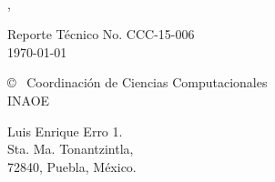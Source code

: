 \begin{titlepage}
    \begin{center}
        \mbox{ }\par
        \vspace{2.5cm}
        {\huge\bfseries\titulo\par}
        {\Large\nombre , \tutorA \par}
        \vspace{3cm}
        {\Large Reporte T\'ecnico No. CCC-15-006\\
		\today \par}
        \vspace{5cm}
        {\Large \copyright~ Coordinaci\'on de Ciencias Computacionales\\
        INAOE\par}
       \vspace{2cm}
    \end{center}
    \begin{center}
    		{\Large
        Luis Enrique Erro 1. \\ Sta. Ma. Tonantzintla, \\ 72840, Puebla, M\'exico. \par}
    \end{center}
    


\end{titlepage}

\addtolength{\hoffset}{0.5cm}
\addtolength{\voffset}{2.0cm}
\addtolength{\oddsidemargin}{-3.0cm}  